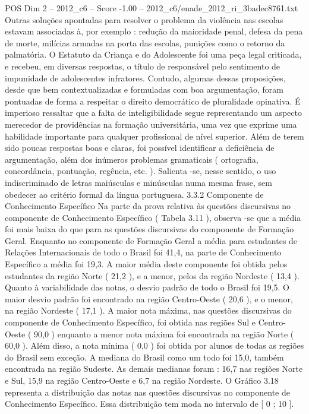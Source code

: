 \begin{textsample}{POS Dim 2 – 2012\_c6 – Score -1.00 – 2012\_c6/enade\_2012\_ri\_3badec8761.txt}
Outras soluções apontadas para resolver o problema da violência nas escolas estavam associadas à, por exemplo : redução da maioridade penal, defesa da pena de morte, milícias armadas na porta das escolas, punições como o retorno da palmatória.
O Estatuto da Criança e do Adolescente foi uma peça legal criticada, e recebeu, em diversas respostas, o título de responsável pelo sentimento de impunidade de adolescentes infratores.
Contudo, algumas dessas proposições, desde que bem contextualizadas e formuladas com boa argumentação, foram pontuadas de forma a respeitar o direito democrático de pluralidade opinativa.
É imperioso ressaltar que a falta de inteligibilidade segue representando um aspecto merecedor de providências na formação universitária, uma vez que exprime uma habilidade importante para qualquer profissional de nível superior.
Além de terem sido poucas respostas boas e claras, foi possível identificar a deficiência de argumentação, além dos inúmeros problemas gramaticais ( ortografia, concordância, pontuação, regência, etc. ).
Salienta -se, nesse sentido, o uso indiscriminado de letras maiúsculas e minúsculas numa mesma frase, sem obedecer ao critério formal da língua portuguesa. 3.3.2 Componente de Conhecimento Específico Na parte da prova relativa às questões discursivas no componente de Conhecimento Específico ( Tabela 3.11 ), observa -se que a média foi mais baixa do que para as questões discursivas do componente de Formação Geral.
Enquanto no componente de Formação Geral a média para estudantes de Relações Internacionais de todo o Brasil foi 41,4, na parte de Conhecimento Específico a média foi 19,3.
A maior média deste componente foi obtida pelos estudantes da região Norte ( 21,2 ), e a menor, pelos da região Nordeste ( 13,4 ).
Quanto à variabilidade das notas, o desvio padrão de todo o Brasil foi 19,5.
O maior desvio padrão foi encontrado na região Centro-Oeste ( 20,6 ), e o menor, na região Nordeste ( 17,1 ).
A maior nota máxima, nas questões discursivas do componente de Conhecimento Específico, foi obtida nas regiões Sul e Centro-Oeste ( 90,0 ) enquanto a menor nota máxima foi encontrada na região Norte ( 60,0 ).
Além disso, a nota mínima ( 0,0 ) foi obtida por alunos de todas as regiões do Brasil sem exceção.
A mediana do Brasil como um todo foi 15,0, também encontrada na região Sudeste.
As demais medianas foram : 16,7 nas regiões Norte e Sul, 15,9 na região Centro-Oeste e 6,7 na região Nordeste.
O Gráfico 3.18 representa a distribuição das notas nas questões discursivas no componente de Conhecimento Específico.
Essa distribuição tem moda no intervalo de [ 0 ; 10 ].

\end{textsample}
